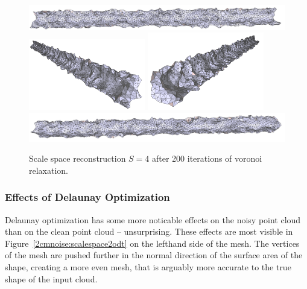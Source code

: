 \documentclass[12pt]{drexelthesis}
\let\Oldsubsubsection\subsubsection
\renewcommand{\subsubsection}{\FloatBarrier\Oldsubsubsection}
\begin{document}
\begin{figure}[!ht]
	\centering
		\includegraphics[width=5in]{simulated-lab-scan/2cmnoise/optimizedNeat/scalespace4lloyd00.png}
		\includegraphics[width=2in]{simulated-lab-scan/2cmnoise/optimizedNeat/scalespace4lloyd01.png}
		\includegraphics[width=2in]{simulated-lab-scan/2cmnoise/optimizedNeat/scalespace4lloyd02.png}
		\includegraphics[width=5in]{simulated-lab-scan/2cmnoise/optimizedNeat/scalespace4lloyd03.png}
		\caption[Scale space reconstruction $S = 4$ after 200 iterations of voronoi relaxation]{\centering Scale space reconstruction $S = 4$ after 200 iterations of voronoi relaxation.}
	\label{2cmnoise:scalespace4lloyd}
\end{figure}



\subsubsection{Effects of Delaunay Optimization}

Delaunay optimization has some more noticable effects on the noisy point cloud than on the clean point cloud -- unsurprising. These effects are most visible in Figure~\ref{2cmnoise:scalespace2odt} on the lefthand side of the mesh. The vertices of the mesh are pushed further in the normal direction of the surface area of the shape, creating a more even mesh, that is arguably more accurate to the true shape of the input cloud.
\end{document}

